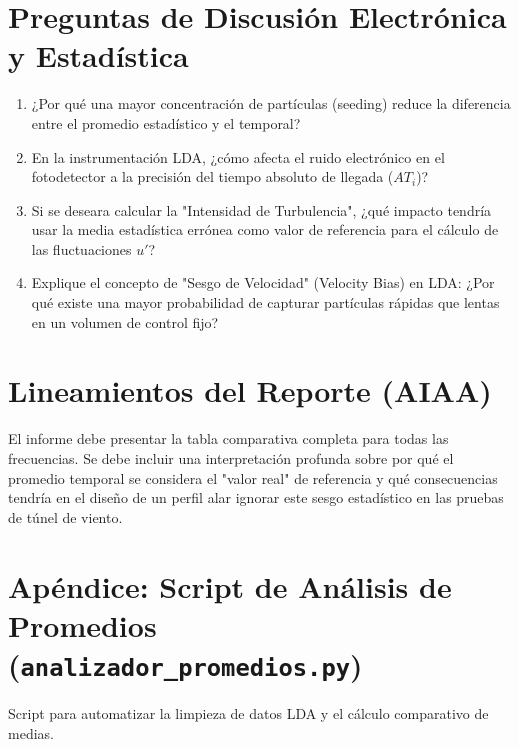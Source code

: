 \documentclass[11pt, a4paper]{article}
\begin{document}
\section{Preguntas de Discusión Electrónica y Estadística}
\begin{enumerate}
    \item ¿Por qué una mayor concentración de partículas (seeding) reduce la diferencia entre el promedio estadístico y el temporal?
    \item En la instrumentación LDA, ¿cómo afecta el ruido electrónico en el fotodetector a la precisión del tiempo absoluto de llegada ($AT_i$)?
    \item Si se deseara calcular la "Intensidad de Turbulencia", ¿qué impacto tendría usar la media estadística errónea como valor de referencia para el cálculo de las fluctuaciones $u'$?
    \item Explique el concepto de "Sesgo de Velocidad" (Velocity Bias) en LDA: ¿Por qué existe una mayor probabilidad de capturar partículas rápidas que lentas en un volumen de control fijo?
\end{enumerate}

\section{Lineamientos del Reporte (AIAA)}
El informe debe presentar la tabla comparativa completa para todas las frecuencias. Se debe incluir una interpretación profunda sobre por qué el promedio temporal se considera el "valor real" de referencia y qué consecuencias tendría en el diseño de un perfil alar ignorar este sesgo estadístico en las pruebas de túnel de viento.

\newpage
\appendix
\section{Apéndice: Script de Análisis de Promedios (\texttt{analizador\_promedios.py})}
Script para automatizar la limpieza de datos LDA y el cálculo comparativo de medias.
\end{document}
